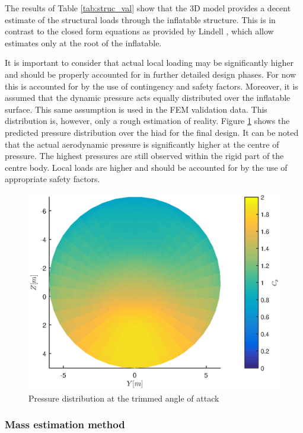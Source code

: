 The results of Table \ref{tab:struc_val} show that the 3D model provides a decent estimate of the structural loads through the inflatable structure. This is in contrast to the closed form equations as provided by Lindell \cite{Lindell2006}, which allow estimates only at the root of the inflatable. 

It is important to consider that actual local loading may be significantly higher and should be properly accounted for in further detailed design phases. For now this is accounted for by the use of contingency and safety factors. Moreover, it is assumed that the dynamic pressure acts equally distributed over the inflatable surface. This same assumption is used in the FEM validation data. This distribution is, however, only a rough estimation of reality. Figure \ref{fig:struc_pres} shows the predicted pressure distribution over the \gls{hiad} for the final design. It can be noted that the actual aerodynamic pressure is significantly higher at the centre of pressure. The highest pressures are still observed within the rigid part of the centre body. Local loads are higher and should be accounted for by the use of appropriate safety factors.

\begin{figure}[h]
\centering
\includegraphics[width=1\textwidth]{./Figure/Structure/FrontviewCpDist}
\caption{Pressure distribution at the trimmed angle of attack} 
\label{fig:struc_pres}
\end{figure}

\subsubsection{Mass estimation method}

